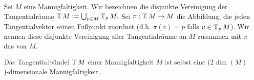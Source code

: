 \begin{df} \label{3.5}
    Sei $M$ eine Mannigfaltigkeit. 
    Wir bezeichnen die disjunkte Vereinigung der Tangentialräume
    \begin{math}
        \operatorname{T} M := \bigcup_{p\in M} \operatorname{T}_p M.
    \end{math}
    Sei $\pi: \operatorname{T} M \to M$ die Abbildung, die jeden Tangentialvektor seinen Fußpunkt zuordnet (d.h. $\pi(v) = p$ falls $v \in \operatorname{T}_p M$).
    Wir nennen diese disjunkte Vereinigung aller Tangentialräume an $M$ zusammen mit $\pi$ das  von $M$.
\end{df}

\begin{st} \label{3.6}
    Das Tangentialbündel $\operatorname{T} M$ einer Mannigfaltigkeit $M$ ist selbst eine ($2 \dim(M)$)-dimensionale Mannigfaltigkeit.

\end{st}
